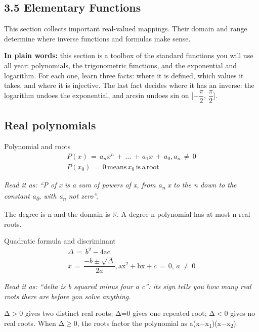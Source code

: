 \documentclass[11pt]{article}
\begin{document}
\begin{keepsection}
\section{3.5 Elementary Functions}

This section collects important real-valued mappings. Their domain and range determine where inverse functions and formulas make sense.

\begin{plainbox}\textbf{In plain words:} this section is a toolbox of the standard functions you will use all year: polynomials, the trigonometric functions, and the exponential and logarithm. For each one, learn three facts: where it is defined, which values it takes, and where it is injective. The last fact decides where it has an inverse: the logarithm undoes the exponential, and arcsin undoes sin on [\ensuremath{-}{\small\ensuremath{\dfrac{π}{2}}}, {\small\ensuremath{\dfrac{π}{2}}}].\end{plainbox}

\begin{keepsection}
\subsection{Real polynomials}

\begin{equationcard}{Polynomial and roots}
\[ \begin{gathered} {P}({x})\, =\, {a}_{{n}}{x}^{{n}}\, +\, …\, +\, {a}_{1}{x}\, +\, {a}_{0}, {a}_{{n}}\, ≠\, 0 \\ {P}({x}_{0})\, =\, 0\, \text{means}\, {x}_{0}\, \text{is}\, \mathrm{a}\, \text{root} \end{gathered} \]
{\small \emph{Read it as: “P of x is a sum of powers of x, from a\textsubscript{n} x to the n down to the constant a\textsubscript{0}, with a\textsubscript{n} not zero”.}\par The degree is n and the domain is \ensuremath{\mathbb{R}}. A degree-n polynomial has at most n real roots.}
\end{equationcard}

\begin{equationcard}{Quadratic formula and discriminant}
\[ \begin{gathered} Δ\, =\, {b}^{2}-4\text{ac} \\ {x}\, =\, \dfrac{-{b}\pm \sqrt{Δ}}{2{a}}, \text{ax}^{2}+\text{bx}+{c}\, =\, 0,\, {a}\, ≠\, 0 \end{gathered} \]
{\small \emph{Read it as: “delta is b squared minus four a c”: its sign tells you how many real roots there are before you solve anything.}\par Δ\ensuremath{>}0 gives two distinct real roots; Δ=0 gives one repeated root; Δ\ensuremath{<}0 gives no real roots. When Δ\ensuremath{\geq}0, the roots factor the polynomial as a(x\ensuremath{-}x\textsubscript{1})(x\ensuremath{-}x\textsubscript{2}).}
\end{equationcard}


\end{keepsection}
\end{keepsection}
\end{document}
